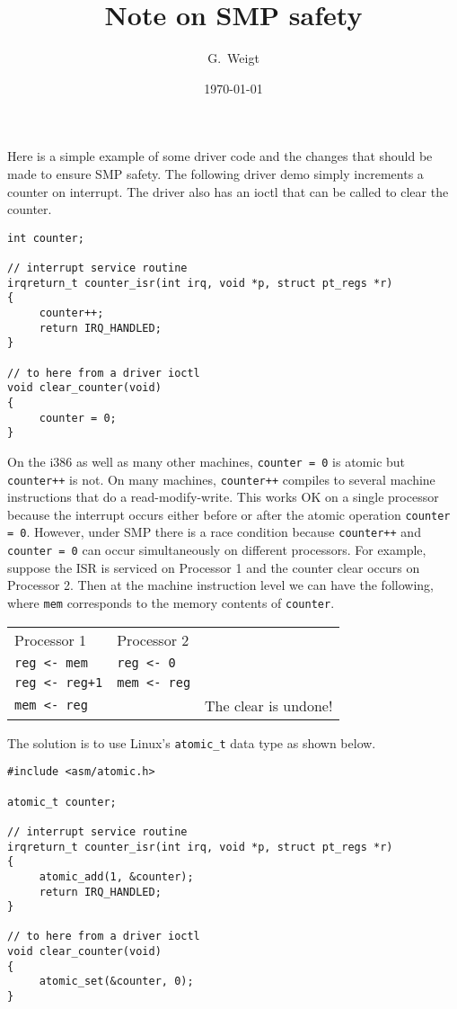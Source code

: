 \documentclass{article}
\author{G.~Weigt}
\title{Note on SMP safety}
\date{\today}
\begin{document}
\maketitle

\noindent
Here is a simple example of some driver code and the changes that should be made
to ensure SMP safety.
The following driver demo simply increments a counter on interrupt.
The driver also has an ioctl that can be called to clear the counter.

\begin{verbatim}
int counter;

// interrupt service routine
irqreturn_t counter_isr(int irq, void *p, struct pt_regs *r)
{
     counter++;
     return IRQ_HANDLED;
}

// to here from a driver ioctl
void clear_counter(void)
{
     counter = 0;
}
\end{verbatim}

\noindent
On the i386 as well as many other machines, \verb$counter = 0$ is atomic but
\verb$counter++$ is not.
On many machines, \verb$counter++$ compiles to several machine instructions that do
a read-modify-write.
This works OK on a single processor because the interrupt
occurs either before or after the atomic operation \verb$counter = 0$.
However, under SMP there is a race condition because
\verb$counter++$ and \verb$counter = 0$ can occur simultaneously on different
processors.
For example, suppose the ISR is serviced on Processor 1 and the counter clear
occurs on Processor 2. Then at the machine instruction level we can have the
following, where \verb$mem$ corresponds to the memory contents of
\verb$counter$.

\bigskip
\begin{tabular}{lll}
Processor 1 & Processor 2 \\
\verb$reg <- mem$ & \verb$reg <- 0$ \\
\verb$reg <- reg+1$ & \verb$mem <- reg$ \\
\verb$mem <- reg$ & & The clear is undone! \\
\end{tabular}

\newpage

\noindent
The solution is to use Linux's \verb$atomic_t$ data type as shown below.

\begin{verbatim}
#include <asm/atomic.h>

atomic_t counter;

// interrupt service routine
irqreturn_t counter_isr(int irq, void *p, struct pt_regs *r)
{
     atomic_add(1, &counter);
     return IRQ_HANDLED;
}

// to here from a driver ioctl
void clear_counter(void)
{
     atomic_set(&counter, 0);
}
\end{verbatim}
\end{document}

